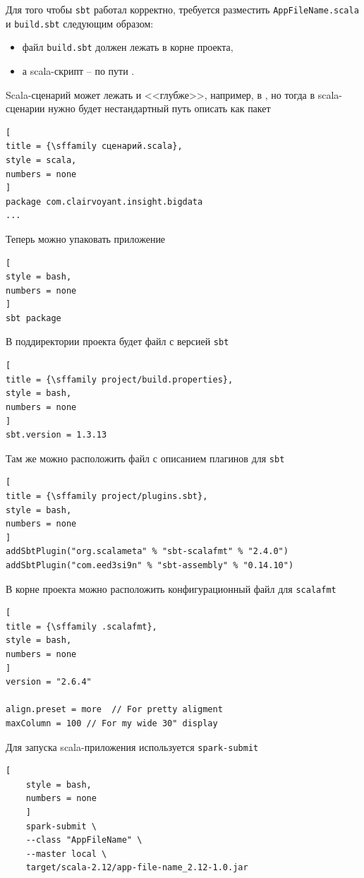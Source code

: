 \documentclass[%
	11pt,
	a4paper,
	utf8,
		]{article}
\begin{document}
Для того чтобы \texttt{sbt} работал корректно, требуется разместить \texttt{AppFileName.scala} и \texttt{build.sbt} следующим образом:
\begin{itemize}
	\item файл \texttt{build.sbt} должен лежать в корне проекта,
	
	\item а scala-скрипт -- по пути .
\end{itemize}

Scala-сценарий может лежать и <<глубже>>, например, в , но тогда в scala-сценарии нужно будет нестандартный путь описать как пакет
\begin{lstlisting}[
title = {\sffamily сценарий.scala},
style = scala,
numbers = none	
]
package com.clairvoyant.insight.bigdata
...
\end{lstlisting}

Теперь можно упаковать приложение
\begin{lstlisting}[
style = bash,
numbers = none	
]
sbt package
\end{lstlisting}

В поддиректории  проекта будет файл с версией \texttt{sbt}
\begin{lstlisting}[
title = {\sffamily project/build.properties},
style = bash,
numbers = none	
]
sbt.version = 1.3.13
\end{lstlisting}

Там же можно расположить файл с описанием плагинов для \texttt{sbt}
\begin{lstlisting}[
title = {\sffamily project/plugins.sbt},
style = bash,
numbers = none	
]
addSbtPlugin("org.scalameta" % "sbt-scalafmt" % "2.4.0")
addSbtPlugin("com.eed3si9n" % "sbt-assembly" % "0.14.10")
\end{lstlisting}

В корне проекта можно расположить конфигурационный файл для \texttt{scalafmt}
\begin{lstlisting}[
title = {\sffamily .scalafmt},
style = bash,
numbers = none	
]
version = "2.6.4"

align.preset = more  // For pretty aligment
maxColumn = 100 // For my wide 30" display
\end{lstlisting}

Для запуска scala-приложения используется \texttt{spark-submit}
\begin{lstlisting}[
	style = bash,
	numbers = none	
	]
	spark-submit \
	--class "AppFileName" \
	--master local \
	target/scala-2.12/app-file-name_2.12-1.0.jar
\end{lstlisting}
\end{document}
